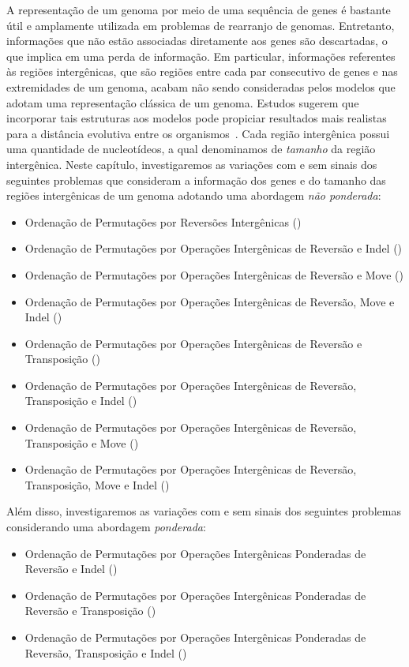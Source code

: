 
A representação de um genoma por meio de uma sequência de genes é bastante útil e amplamente utilizada em problemas de rearranjo de genomas. Entretanto, informações que não estão associadas diretamente aos genes são descartadas, o que implica em uma perda de informação. Em particular, informações referentes às regiões intergênicas, que são regiões entre cada par consecutivo de genes e nas extremidades de um genoma, acabam não sendo consideradas pelos modelos que adotam uma representação clássica de um genoma. Estudos sugerem que incorporar tais estruturas aos modelos pode propiciar resultados mais realistas para a distância evolutiva entre os organismos~\cite{2016a-biller-etal, 2016b-biller-etal}. Cada região intergênica possui uma quantidade de nucleotídeos, a qual denominamos de \emph{tamanho} da região intergênica. Neste capítulo, investigaremos as variações com e sem sinais dos seguintes problemas que consideram a informação dos genes e do tamanho das regiões intergênicas de um genoma adotando uma abordagem \emph{não ponderada}:

\begin{itemize}
  \item Ordenação de Permutações por Reversões Intergênicas (\SbIR)
  \item Ordenação de Permutações por Operações Intergênicas de Reversão e Indel (\SbIRI)
  \item Ordenação de Permutações por Operações Intergênicas de Reversão e Move \break (\SbIRM)
  \item Ordenação de Permutações por Operações Intergênicas de Reversão, Move e Indel (\SbIRMI)
  \item Ordenação de Permutações por Operações Intergênicas de Reversão e Transposição (\SbIRT)
  \item Ordenação de Permutações por Operações Intergênicas de Reversão, Transposição e Indel (\SbIRTI)
  \item Ordenação de Permutações por Operações Intergênicas de Reversão, Transposição e Move (\SbIRTM)
  \item Ordenação de Permutações por Operações Intergênicas de Reversão, Transposição, Move e Indel (\SbIRTMI)
\end{itemize}

Além disso, investigaremos as variações com e sem sinais dos seguintes problemas considerando uma abordagem \emph{ponderada}:

\begin{itemize}
  \item Ordenação de Permutações por Operações Intergênicas Ponderadas de Reversão e Indel (\SbWIRI)
  \item Ordenação de Permutações por Operações Intergênicas Ponderadas de Reversão e Transposição (\SbWIRT)
  \item Ordenação de Permutações por Operações Intergênicas Ponderadas de Reversão, Transposição e Indel (\SbWIRTI)
\end{itemize}

